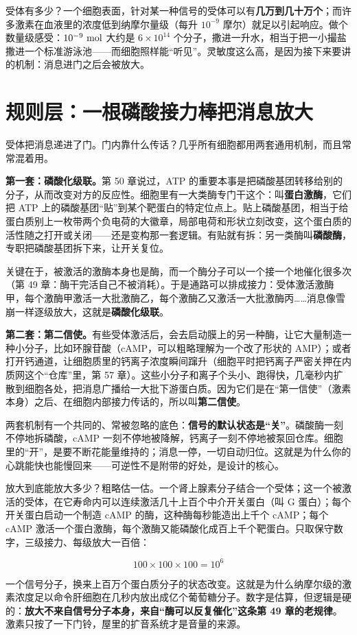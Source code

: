 受体有多少？一个细胞表面，针对某一种信号的受体可以有\textbf{几万到几十万个}；而许多激素在血液里的浓度低到纳摩尔量级（每升 $10^{-9}$ 摩尔）就足以引起响应。做个数量级感受：$10^{-9}\ \mathrm{mol}$ 大约是 $6\times10^{14}$ 个分子，撒进一升水，相当于把一小撮盐撒进一个标准游泳池——而细胞照样能“听见”。灵敏度这么高，是因为接下来要讲的机制：消息进门之后会被放大。

\section{规则层：一根磷酸接力棒把消息放大}

受体把消息递进了门。门内靠什么传话？几乎所有细胞都用两套通用机制，而且常常混着用。

\textbf{第一套：磷酸化级联。}第 50 章说过，ATP 的重要本事是把磷酸基团转移给别的分子，从而改变对方的反应性。细胞里有一大类酶专门干这个：叫\textbf{蛋白激酶}，它们把 ATP 上的磷酸基团“贴”到某个靶蛋白的特定位点上。贴上磷酸基团，相当于给蛋白质别上一枚带两个负电荷的大徽章，局部电荷和形状立刻改变，这个蛋白质的活性随之打开或关闭——还是变构那一套逻辑。有贴就有拆：另一类酶叫\textbf{磷酸酶}，专职把磷酸基团拆下来，让开关复位。

关键在于，被激活的激酶本身也是酶，而一个酶分子可以一个接一个地催化很多次（第 49 章：酶干完活自己不被消耗）。于是通路可以排成接力：受体激活激酶甲，每个激酶甲激活一大批激酶乙，每个激酶乙又激活一大批激酶丙……消息像雪崩一样逐级放大，这就是\textbf{磷酸化级联}。

\textbf{第二套：第二信使。}有些受体激活后，会去启动膜上的另一种酶，让它大量制造一种小分子，比如环腺苷酸（cAMP，可以粗略理解为一个改了形状的 AMP）；或者打开钙通道，让细胞质里的钙离子浓度瞬间蹿升（细胞平时把钙离子严密关押在内质网这个“仓库”里，第 57 章）。这些小分子和离子个头小、跑得快，几毫秒内扩散到细胞各处，把消息广播给一大批下游蛋白质。因为它们是在“第一信使”（激素本身）之后、在细胞内部接力传话的，所以叫\textbf{第二信使}。

两套机制有一个共同的、常被忽略的底色：\textbf{信号的默认状态是“关”}。磷酸酶一刻不停地拆磷酸，cAMP 一刻不停地被降解，钙离子一刻不停地被泵回仓库。细胞里的“开”，是要不断花能量维持的；消息一停，一切自动归位。这就是为什么你的心跳能快也能慢回来——可逆性不是附带的好处，是设计的核心。

\begin{qiaoliang}
放大到底能放大多少？粗略估一估。一个肾上腺素分子结合一个受体；这一个被激活的受体，在它寿命内可以连续激活几十上百个中介开关蛋白（叫 G 蛋白）；每个开关蛋白启动一个制造 cAMP 的酶，这种酶每秒能造出上千个 cAMP；每个 cAMP 激活一个蛋白激酶，每个激酶又能磷酸化成百上千个靶蛋白。只取保守数字，三级接力、每级放大一百倍：

\[100\times100\times100 = 10^{6}\]

一个信号分子，换来上百万个蛋白质分子的状态改变。这就是为什么纳摩尔级的激素浓度足以命令肝细胞在几秒内放出成亿个葡萄糖分子。数字是估算，但逻辑是硬的：\textbf{放大不来自信号分子本身，来自“酶可以反复催化”这条第 49 章的老规律}。激素只按了一下门铃，屋里的扩音系统才是音量的来源。
\end{qiaoliang}

